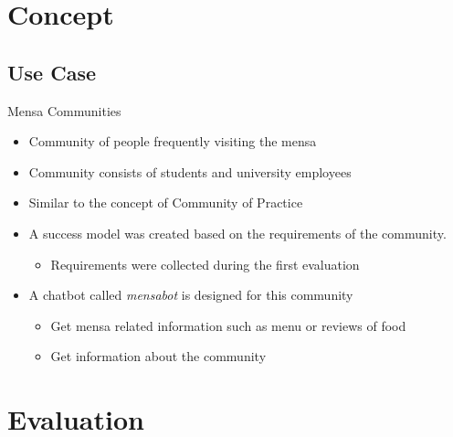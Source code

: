 \section{Concept}
\subsection{Use Case}
\begin{frame}{Mensa Communities}
  \begin{itemize}
    \item Community of people frequently visiting the mensa
    \item Community consists of students and university employees
    \item Similar to the concept of Community of Practice %
\item A success model was created based on the requirements of the community.
\begin{itemize}
  \item Requirements were collected during the first evaluation
\end{itemize} 
    \item A chatbot called \emph{mensabot} is designed for this community
    \begin{itemize}
      \item Get mensa related information such as menu or reviews of food
      \item Get information about the community
    \end{itemize}
  \end{itemize}
\end{frame}



\section{Evaluation}

